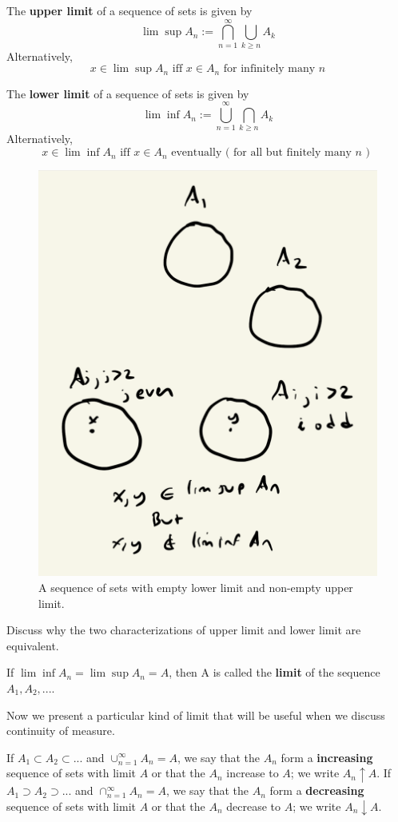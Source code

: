 \documentclass{article} %
\begin{document}
\begin{definition}
The \textbf{upper limit} of a sequence of sets is given by
\[ \lim\sup A_n := \bigcap_{n=1}^\infty \bigcup_{k \geq n} A_k \]
Alternatively,
\[ x \in \lim\sup A_n \text{ iff } x \in A_n \text{ for infinitely many } n \]
\end{definition}

\begin{definition}
The \textbf{lower limit} of a sequence of sets is given by
\[ \lim\inf A_n := \bigcup_{n=1}^\infty \bigcap_{k \geq n} A_k \]
Alternatively,
\[ x \in \lim\inf A_n \text{ iff } x \in A_n \text{ eventually ( for all but finitely many $n$ ) } \]
\end{definition}

\begin{figure}
\centering 
\includegraphics[width=.5\textwidth]{images/limsup_and_liminf}	
\caption{A sequence of sets with empty lower limit and non-empty upper limit.}
\end{figure}

\begin{discussion}
Discuss why the two characterizations of upper limit and lower limit are equivalent.	
\end{discussion}

\begin{definition}
If $\lim\inf A_n = \lim\sup A_n = A$, then A is called the \textbf{limit} of the sequence $A_1, A_2, ...$. 
\end{definition}

Now we present a particular kind of limit that will be useful when we discuss continuity of measure. 

\begin{definition}
If $A_1 \subset A_2 \subset ...$ and $\cup_{n=1}^\infty A_n = A$, we say that the $A_n$ form a \textbf{increasing} sequence of sets with limit $A$ or that the $A_n$ increase to $A$; we write $A_n \uparrow A$.  If $A_1 \supset A_2 \supset ... $ and  	$\cap_{n=1}^\infty A_n = A$, we say that the $A_n$ form a \textbf{decreasing} sequence of sets with limit $A$ or that the $A_n$ decrease to $A$; we write $A_n \downarrow A$.
\end{definition}
\end{document}
